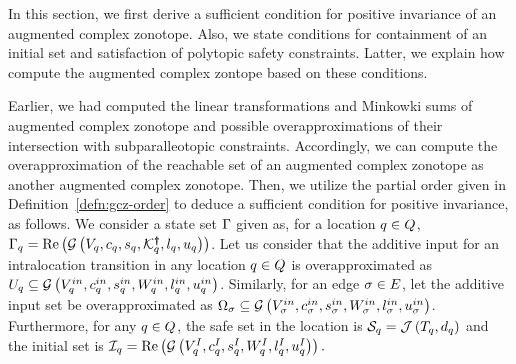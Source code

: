 In this section, we first derive a sufficient condition for positive
invariance of an augmented complex zonotope.  Also, we state
conditions for containment of an initial set and satisfaction of
polytopic safety constraints.  Latter, we explain how compute the
augmented complex zontope based on these conditions.

Earlier, we had computed the linear transformations and Minkowki sums
of augmented complex zonotope and possible overapproximations of their
intersection with subparalleotopic constraints.  Accordingly, we can
compute the overapproximation of the reachable set of an augmented
complex zonotope as another augmented complex zonotope.  Then, we
utilize the partial order given in Definition~\ref{defn:gcz-order} to
  deduce a sufficient condition for positive invariance, as follows.
%
We consider a state set $\Gamma$ given as, for a location
  $q\in Q$,
  $\Gamma_q=\operatorname{\operatorname{Re}}\left(\mathcal{G}\left(V_q,c_q,s_q,\mathcal{K}^{\bm{\dagger}}_q,l_q,u_q\right)\right)$.
  Let us consider that the additive input for an intralocation
  transition in any location $q\in Q$ is overapproximated
  as
  $U_q\subseteq \mathcal{G}\left(V^{in}_q,c^{in}_q,s^{in}_q,W^{in}_q,l^{in}_q,u^{in}_q\right)$.
  Similarly, for an edge $\sigma\in E$, let the additive input
  set be
  overapproximated as
  $\Omega_\sigma\subseteq \mathcal{G}\left(V^{in}_\sigma,c^{in}_\sigma,s^{in}_\sigma,W^{in}_\sigma,l^{in}_\sigma,u^{in}_\sigma\right)$.
  Furthermore, for any $q\in Q$, the safe set in the
  location is $\mathcal{S}_q=\mathcal{J}\left(T_q,d_q\right)$ and the
  initial set is
  $\mathcal{I}_q=\operatorname{\operatorname{Re}}\left(\mathcal{G}\left(V^I_q,c^I_q,s^I_q,W^I_q,l^I_q,u^I_q\right)\right).$
  


